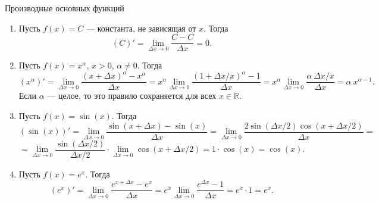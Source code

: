 \documentclass[8pt]{beamer}
\begin{document}
\begin{frame}{Производные основных функций}
\begin{enumerate}
\item Пусть $f(x) = C$ --- константа, не зависящая от $x$. Тогда
$$\left( C \right)' = \lim_{\Delta x\to0}\frac{C - C}{\Delta x} =0.$$
\item Пусть $f(x) = x^{\alpha}$, $x>0$, $\alpha\ne0$. Тогда
$$\left( x^{\alpha} \right)' = \lim_{\Delta x\to0}\frac{(x+\Delta x)^{\alpha} - x^{\alpha}}{\Delta x} = x^\alpha  \lim_{\Delta x\to0}\frac{(1+\Delta x/x)^{\alpha} - 1}{\Delta x} =  x^\alpha  \lim_{\Delta x\to0}\frac{\alpha \ \Delta x / x}{\Delta x} = \alpha\ x^{\alpha-1}.$$
Если $\alpha$ --- целое, то это правило сохраняется для всех $x\in\mathbb{R}$.
\item Пусть $f(x)=\sin(x)$. Тогда
$$\left( \sin(x) \right)' =
 \lim_{\Delta x\to0} \frac{\sin(x+\Delta x) - \sin(x)}{\Delta x} =
 \lim_{\Delta x\to0} \frac{2\sin(\Delta x/2)\cos(x+\Delta x/2)}{\Delta x}=
$$
$$=
 \lim_{\Delta x\to0} \frac{\sin(\Delta x/2)}{\Delta x/2}\cdot
 \lim_{\Delta x\to0} \cos(x+\Delta x/2)=1\cdot\cos(x)=\cos(x).
$$
\item Пусть $f(x)=e^x$. Тогда
$$\left( e^x \right)' =
 \lim_{\Delta x\to0} \frac{e^{x+\Delta x} -e^x}{\Delta x} =
e^x \lim_{\Delta x\to0} \frac{e^{\Delta x}-1}{\Delta x}=e^x\cdot 1=e^x.
$$
\end{enumerate}
\end{frame}

\end{document}
